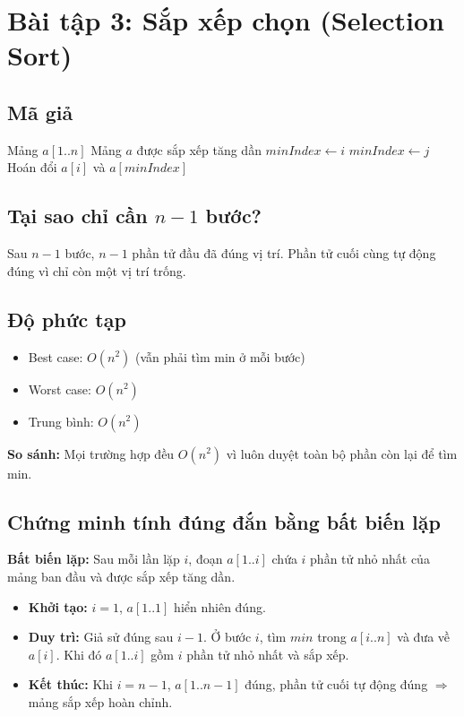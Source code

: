\documentclass[12pt,a4paper]{article}
\begin{document}
\section*{Bài tập 3: Sắp xếp chọn (Selection Sort)}

\subsection*{Mã giả}
\begin{algorithm}[H]
\caption{Selection Sort}
\begin{algorithmic}
\REQUIRE Mảng $a[1..n]$
\ENSURE Mảng $a$ được sắp xếp tăng dần
    \STATE $minIndex \leftarrow i$
            \STATE $minIndex \leftarrow j$
        \ENDIF
    \ENDFOR
    \STATE Hoán đổi $a[i]$ và $a[minIndex]$
\ENDFOR
\end{algorithmic}
\end{algorithm}

\subsection*{Tại sao chỉ cần $n-1$ bước?}
Sau $n-1$ bước, $n-1$ phần tử đầu đã đúng vị trí. Phần tử cuối cùng tự động đúng vì chỉ còn một vị trí trống.

\subsection*{Độ phức tạp}
\begin{itemize}
    \item Best case: $O(n^2)$ (vẫn phải tìm min ở mỗi bước)
    \item Worst case: $O(n^2)$
    \item Trung bình: $O(n^2)$
\end{itemize}
\textbf{So sánh:} Mọi trường hợp đều $O(n^2)$ vì luôn duyệt toàn bộ phần còn lại để tìm min.

\subsection*{Chứng minh tính đúng đắn bằng bất biến lặp}
\textbf{Bất biến lặp:} Sau mỗi lần lặp $i$, đoạn $a[1..i]$ chứa $i$ phần tử nhỏ nhất của mảng ban đầu và được sắp xếp tăng dần.

\begin{itemize}
    \item \textbf{Khởi tạo:} $i=1$, $a[1..1]$ hiển nhiên đúng.
    \item \textbf{Duy trì:} Giả sử đúng sau $i-1$. Ở bước $i$, tìm $min$ trong $a[i..n]$ và đưa về $a[i]$. Khi đó $a[1..i]$ gồm $i$ phần tử nhỏ nhất và sắp xếp.
    \item \textbf{Kết thúc:} Khi $i=n-1$, $a[1..n-1]$ đúng, phần tử cuối tự động đúng $\Rightarrow$ mảng sắp xếp hoàn chỉnh.
\end{itemize}
\end{document}
